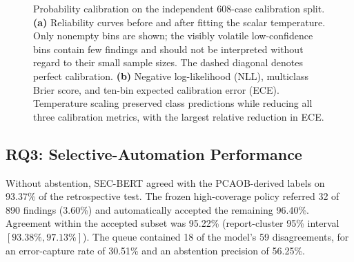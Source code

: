 \documentclass[11pt]{article}
\begin{document}
\begin{figure}[htbp]
{%
  }
  \caption{Probability calibration on the independent 608-case calibration
  split. \textbf{(a)} Reliability curves before and after fitting the scalar
  temperature. Only nonempty bins are shown; the visibly volatile low-confidence
  bins contain few findings and should
  not be interpreted without regard to their small sample sizes. The dashed
  diagonal denotes perfect calibration. \textbf{(b)} Negative log-likelihood
  (NLL), multiclass Brier score, and ten-bin expected calibration error (ECE).
  Temperature scaling preserved class predictions while reducing all three
  calibration metrics, with the largest relative reduction in ECE.}
  \label{fig:probability-calibration}
\end{figure}

\subsection{RQ3: Selective-Automation Performance}

Without abstention, SEC-BERT agreed with the PCAOB-derived labels on 93.37\% of
the retrospective test. The frozen high-coverage policy referred 32 of 890
findings (3.60\%) and automatically accepted the remaining 96.40\%. Agreement
within the accepted subset was 95.22\% (report-cluster 95\% interval
$[93.38\%,97.13\%]$). The queue contained 18 of the model's 59 disagreements,
for an error-capture rate of 30.51\% and an abstention precision of 56.25\%.
\end{document}
